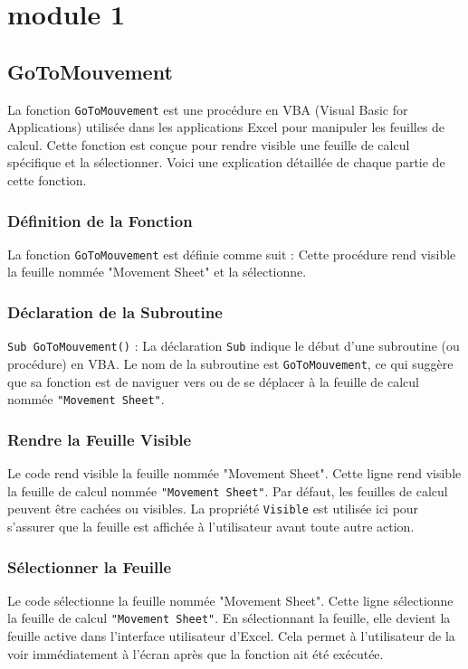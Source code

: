 \documentclass[a4paper, oneside, 12pt, final]{extreport}
\begin{document}
\section{module 1}
\subsection{GoToMouvement}

La fonction \texttt{GoToMouvement} est une procédure en VBA (Visual Basic for Applications) utilisée dans les applications Excel pour manipuler les feuilles de calcul. Cette fonction est conçue pour rendre visible une feuille de calcul spécifique et la sélectionner. Voici une explication détaillée de chaque partie de cette fonction.

\subsubsection{Définition de la Fonction}

La fonction \texttt{GoToMouvement} est définie comme suit :
Cette procédure rend visible la feuille nommée "Movement Sheet" et la sélectionne.

\subsubsection{Déclaration de la Subroutine}

\texttt{Sub GoToMouvement()} : La déclaration \texttt{Sub} indique le début d'une subroutine (ou procédure) en VBA. Le nom de la subroutine est \texttt{GoToMouvement}, ce qui suggère que sa fonction est de naviguer vers ou de se déplacer à la feuille de calcul nommée \texttt{"Movement Sheet"}.

\subsubsection{Rendre la Feuille Visible}
Le code rend visible la feuille nommée "Movement Sheet".
Cette ligne rend visible la feuille de calcul nommée \texttt{"Movement Sheet"}. Par défaut, les feuilles de calcul peuvent être cachées ou visibles. La propriété \texttt{Visible} est utilisée ici pour s'assurer que la feuille est affichée à l'utilisateur avant toute autre action.

\subsubsection{Sélectionner la Feuille}
Le code sélectionne la feuille nommée "Movement Sheet".
Cette ligne sélectionne la feuille de calcul \texttt{"Movement Sheet"}. En sélectionnant la feuille, elle devient la feuille active dans l'interface utilisateur d'Excel. Cela permet à l'utilisateur de la voir immédiatement à l'écran après que la fonction ait été exécutée.
\end{document}
